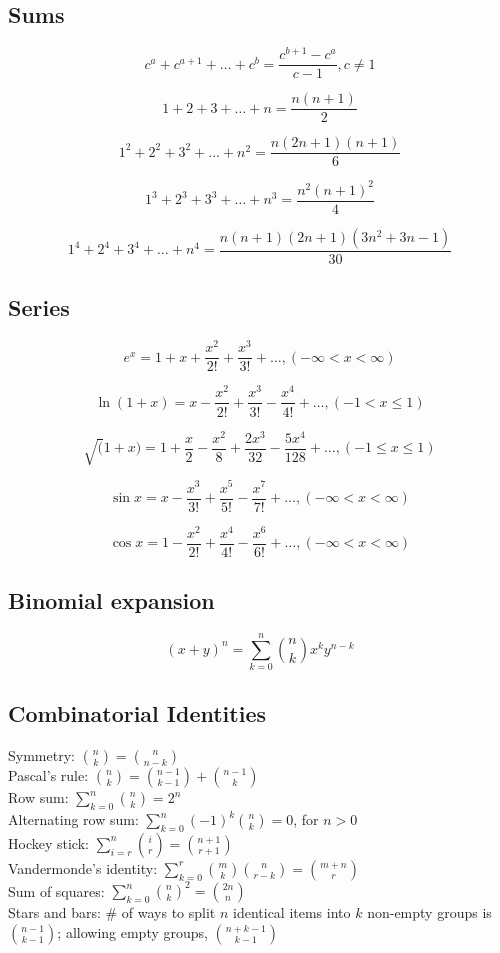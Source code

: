     \subsection{Sums}
        $$
        c^a + c^{a + 1} + \dots +  c^b = \frac{c^{b + 1} - c^a}{c - 1}, c \neq 1
        $$

        $$
            1 + 2 + 3 + \dots + n = \frac{n (n + 1)}{2}
        $$

        $$
            1^2 + 2^2 + 3^2 + \dots + n^2 = \frac{n (2n + 1)(n + 1)}{6}
        $$

        $$
            1^3 + 2^3 + 3^3 + \dots + n^3 = \frac{n^2(n + 1)^2}{4}
        $$

        $$
            1^4 + 2^4 + 3^4 + \dots + n^4 = \frac{n(n + 1)(2n + 1)(3n^2 + 3n - 1)}{30}
        $$
    \subsection{Series}
        $$
        e^x = 1 + x + \frac{x^2}{2!} +\frac{x^3}{3!} + \dots, (-\infty < x < \infty)
        $$

        $$
        \ln(1 + x) = x - \frac{x^2}{2!} + \frac{x^3}{3!} - \frac{x^4}{4!} + \dots, (-1 < x \leq 1)
        $$

        $$
        \sqrt(1 + x) = 1 + \frac{x}{2} - \frac{x^2}{8} + \frac{2x^3}{32} - \frac{5x^4}{128}  + \dots, (-1 \leq x \leq 1)
        $$

        $$
        \sin x = x - \frac{x^3}{3!} + \frac{x^5}{5!} - \frac{x^7}{7!} + \dots, (-\infty < x < \infty)
        $$

        $$
        \cos x = 1 - \frac{x^2}{2!} + \frac{x^4}{4!} - \frac{x^6}{6!} + \dots, (-\infty < x < \infty)
        $$
    \subsection{Binomial expansion}
        $$
        (x + y)^n = \sum_{k = 0}^{n} \binom{n}{k} x^{k} y^{n - k}
        $$
    \subsection{Combinatorial Identities}
        Symmetry: $\binom{n}{k} = \binom{n}{n - k}$ \\
        Pascal's rule: $\binom{n}{k} = \binom{n - 1}{k - 1} + \binom{n - 1}{k}$ \\
        Row sum: $\sum_{k=0}^{n} \binom{n}{k} = 2^n$ \\
        Alternating row sum: $\sum_{k=0}^{n} (-1)^k \binom{n}{k} = 0$, for $n > 0$ \\
        Hockey stick: $\sum_{i=r}^{n} \binom{i}{r} = \binom{n + 1}{r + 1}$ \\
        Vandermonde's identity: $\sum_{k=0}^{r} \binom{m}{k}\binom{n}{r - k} = \binom{m + n}{r}$ \\
        Sum of squares: $\sum_{k=0}^{n} \binom{n}{k}^2 = \binom{2n}{n}$ \\
        Stars and bars: \# of ways to split $n$ identical items into $k$ non-empty groups is $\binom{n - 1}{k - 1}$; allowing empty groups, $\binom{n + k - 1}{k - 1}$
